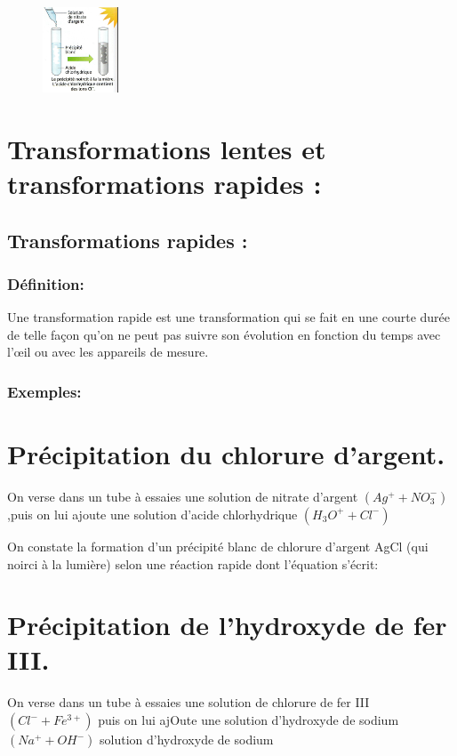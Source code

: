 \documentclass[12pt]{article}
\begin{document}
\begin{figure}
	\vspace{-1.95cm}
	\includegraphics[width=0.2\textwidth]{./img/TRLprecipitationChlorure.png}
\end{figure}


\section{Transformations lentes et transformations rapides : }
\subsection{Transformations rapides :  }
\subsubsection{ Définition: }
Une transformation rapide est une transformation qui se fait en une courte durée de telle façon qu'on ne peut pas suivre son
évolution en fonction du temps avec l'œil ou avec les appareils de mesure.

\subsubsection{Exemples:}

\section*{Précipitation du chlorure d'argent.}
On verse dans un tube à essaies une solution de nitrate d'argent $(Ag^+ + NO_3^-)$ ,puis on lui ajoute une solution d'acide chlorhydrique $(H_3O^+  + Cl^-)$

On constate la formation d'un précipité blanc de chlorure d'argent AgCl (qui noirci à la lumière) selon une réaction rapide dont l'équation s'écrit:


\section*{Précipitation de l'hydroxyde de fer III.}
On verse dans un tube à essaies une solution de chlorure de fer III $(Cl^- +Fe^{3+} )$ puis on lui ajOute une solution d'hydroxyde de sodium $(Na^+ + OH^-)$
solution d'hydroxyde de sodium
\end{document}
